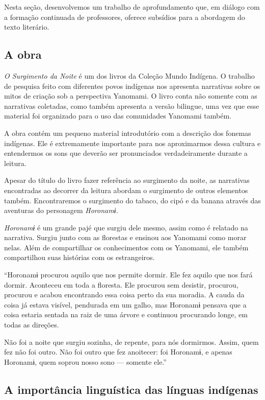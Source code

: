 \documentclass[12pt]{extarticle}
\begin{document}
Nesta seção, desenvolvemos um trabalho de aprofundamento que, em diálogo
com a formação continuada de professores, oferece subsídios para a
abordagem do texto literário.

\subsection{A obra}

\emph{O Surgimento da Noite} é um dos livros da Coleção Mundo Indígena.
O trabalho de pesquisa feito com diferentes povos indígenas nos
apresenta narrativas sobre os mitos de criação sob a perspectiva
Yanomami. O livro conta não somente com as narrativas coletadas, como
também apresenta a versão bilingue, uma vez que esse material foi
organizado para o uso das comunidades Yanomami também.

A obra contém um pequeno material introdutório com a descrição dos
fonemas indígenas. Ele é extremamente importante para nos aproximarmos
dessa cultura e entendermos os sons que deverão ser pronunciados
verdadeiramente durante a leitura.

Apesar do título do livro fazer referência ao surgimento da noite, as
narrativas encontradas ao decorrer da leitura abordam o surgimento de
outros elementos também. Encontraremos o surgimento do tabaco, do cipó e
da banana através das aventuras do personagem \emph{Horonamɨ.}

\emph{Horonamɨ} é um grande pajé que surgiu dele mesmo, assim como é
relatado na narrativa. Surgiu junto com as florestas e ensinou aos
Yanomami como morar nelas. Além de compartilhar os conhecimentos com os
Yanomami, ele também compartilhou suas histórias com os estrangeiros.

``Horonamɨ procurou aquilo que nos permite dormir. Ele fez aquilo que nos 
fará dormir. Aconteceu em toda a floresta. Ele procurou sem desistir, procurou, 
procurou e acabou encontrando essa coisa perto da sua moradia. A cauda da coisa 
já estava visível, pendurada em um galho, mas Horonamɨ pensava que a coisa estaria 
sentada na raiz de uma árvore e continuou procurando longe, em todas as direções.

Não foi a noite que surgiu sozinha, de repente, para nós dormirmos. Assim, quem fez 
não foi outro. Não foi outro que fez anoitecer: foi Horonamɨ, e apenas Horonamɨ, quem 
soprou nosso sono — somente ele.''


\subsection{A importância linguística das línguas indígenas}
\end{document}

